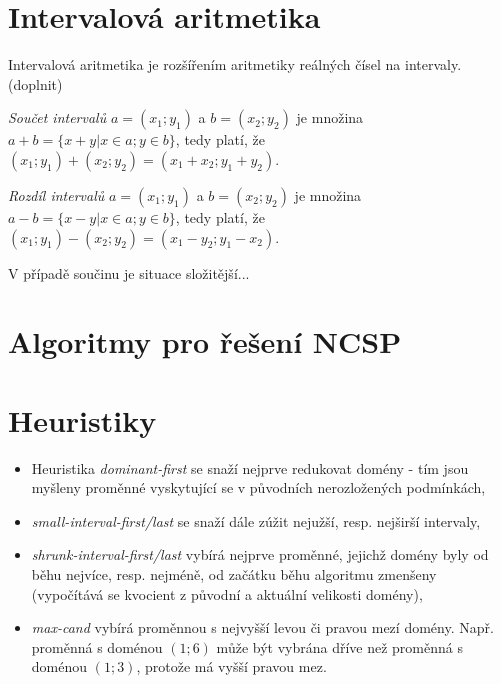 \section{Intervalová aritmetika}
\label{ch:interval_arithmetic}
Intervalová aritmetika je rozšířením aritmetiky reálných čísel na intervaly. (doplnit)

\begin{definition}
\label{def:interval_add}
\emph {Součet intervalů} $a = (x_1; y_1)$ a $b = (x_2; y_2)$ je množina $a + b = \{x+y | x \in a; y \in b \}$, tedy platí, že $(x_1; y_1) + (x_2; y_2) = (x_1 + x_2; y_1 + y_2)$.
\end{definition}

\begin{definition}
\label{def:interval_sub}
\emph {Rozdíl intervalů} $a = (x_1; y_1)$ a $b = (x_2; y_2)$ je množina $a - b = \{x-y | x \in a; y \in b \}$, tedy platí, že $(x_1; y_1) - (x_2; y_2) = (x_1 - y_2; y_1 - x_2)$.
\end{definition}

V případě součinu je situace složitější... 


\section{Algoritmy pro řešení NCSP}


\section{Heuristiky}
\begin{itemize}
  \item Heuristika \emph{dominant-first} se snaží nejprve redukovat domény  - tím jsou myšleny proměnné vyskytující se v původních nerozložených podmínkách,
  \item \emph{small-interval-first/last} se snaží dále zúžit nejužší, resp. nejširší intervaly,
  \item \emph{shrunk-interval-first/last} vybírá nejprve proměnné, jejichž domény byly od běhu nejvíce, resp. nejméně, od začátku běhu algoritmu zmenšeny (vypočítává se kvocient z původní a aktuální velikosti domény),
  \item \emph{max-cand} vybírá proměnnou s nejvyšší levou či pravou mezí domény. Např. proměnná s doménou $(1;6)$ může být vybrána dříve než proměnná s doménou $(1;3)$, protože má vyšší pravou mez.
\end{itemize}



